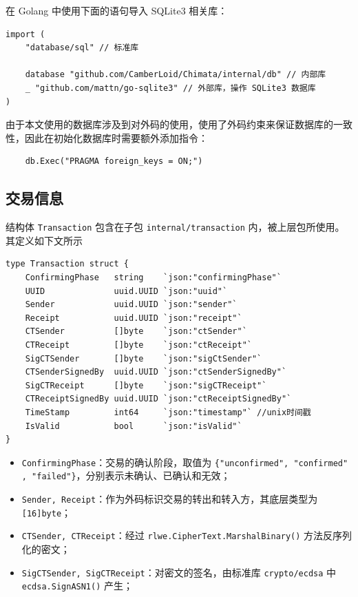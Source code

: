 在 Golang 中使用下面的语句导入 SQLite3 相关库：

\begin{verbatim}
import (
    "database/sql" // 标准库
    
    database "github.com/CamberLoid/Chimata/internal/db" // 内部库
    _ "github.com/mattn/go-sqlite3" // 外部库，操作 SQLite3 数据库
)
\end{verbatim}

由于本文使用的数据库涉及到对外码的使用，使用了外码约束来保证数据库的一致性，因此在初始化数据库时需要额外添加指令：

\begin{verbatim}
    db.Exec("PRAGMA foreign_keys = ON;")
\end{verbatim}
 
\subsection{交易信息}

结构体 \verb|Transaction| 包含在子包 \verb|internal/transaction| 内，被上层包所使用。其定义如下文所示

\begin{verbatim}
type Transaction struct {
    ConfirmingPhase   string    `json:"confirmingPhase"`
    UUID              uuid.UUID `json:"uuid"`
    Sender            uuid.UUID `json:"sender"`
    Receipt           uuid.UUID `json:"receipt"`
    CTSender          []byte    `json:"ctSender"`
    CTReceipt         []byte    `json:"ctReceipt"`
    SigCTSender       []byte    `json:"sigCtSender"`
    CTSenderSignedBy  uuid.UUID `json:"ctSenderSignedBy"`
    SigCTReceipt      []byte    `json:"sigCTReceipt"`
    CTReceiptSignedBy uuid.UUID `json:"ctReceiptSignedBy"`
    TimeStamp         int64     `json:"timestamp"` //unix时间戳
    IsValid           bool      `json:"isValid"`
}    
\end{verbatim}

\begin{itemize}
    \item \verb|ConfirmingPhase|：交易的确认阶段，取值为 \verb|{"unconfirmed", "confirmed"|\\
    \verb|, "failed"}|，分别表示未确认、已确认和无效；
    \item \verb|Sender, Receipt|：作为外码标识交易的转出和转入方，其底层类型为 \verb|[16]byte|；
    \item \verb|CTSender, CTReceipt|：经过 \verb|rlwe.CipherText.MarshalBinary()| 方法反序列化的密文；
    \item \verb|SigCTSender, SigCTReceipt|：对密文的签名，由标准库 \verb|crypto/ecdsa| 中 \verb|ecdsa.SignASN1()| 产生；
\end{itemize}


